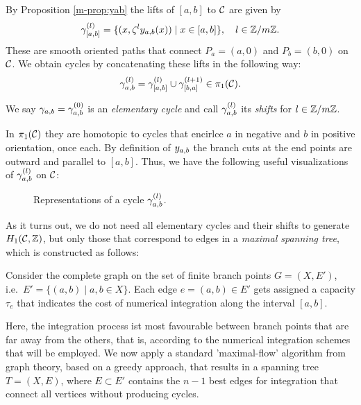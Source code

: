 \documentclass[main.tex]{subfiles}
\begin{document}
   By Proposition \ref{m-prop:yab} the lifts of $[a,b]$ to $\mathcal{C}$ are given by
   \begin{equation}\label{eq:def_path_ab}
      \gamma^{(l)}_{[a,b]} = \{  (x,\zeta^l y_{a,b}(x))  \mid  x \in [a,b]  \}, \quad l \in \mathbb{Z}/m\mathbb{Z}.
   \end{equation}
   These are smooth oriented paths that connect $P_a = (a,0)$ and $P_b = (b,0)$ on $\mathcal{C}$. We obtain cycles by concatenating these lifts in the following way:
    \begin{equation}\label{eq:def_cyabl}
      \gamma_{a,b}^{(l)} = \gamma^{(l)}_{[a,b]} \cup \gamma^{(l+1)}_{[b,a]} \in \pi_1(\mathcal{C}).
   \end{equation}
   \begin{defn}\label{def:elem_cycles}
       We say $\gamma_{a,b} = \gamma_{a,b}^{(0)}$ is an \emph{elementary cycle} and call $\gamma_{a,b}^{(l)}$ its \emph{shifts} for $l \in \mathbb{Z}/m\mathbb{Z}$.
   \end{defn}
   In $\pi_1(\mathcal{C})$
   they are homotopic to cycles that encirlce  $a$ in negative and $b$ in positive orientation, once each.
   By definition of $y_{a,b}$ the branch cuts at the end points are outward and parallel to $[a,b]$. Thus, we have the following useful visualizations of $\gamma_{a,b}^{(l)}$ on $\mathcal{C}$:
   \begin{figure}[H]
      \begin{center}
   
      \end{center}
    \caption{Representations of a cycle $\gamma_{a,b}^{(l)}$.}
    \label{fig:elem_cycle}
\end{figure}

  \bigskip

  As it turns out, we do not need all elementary cycles and their shifts to generate $H_1(\mathcal{C},\mathbb{Z})$, but only those that correspond to edges in a \emph{maximal spanning tree}, which is constructed
  as follows: 
  
  \medskip
   Consider the complete graph on the set of finite branch points $G = (X,E')$, i.e.\ $E' = \{  (a,b)  \mid  a,b \in X \}$.
   Each edge $e = (a,b) \in E'$ gets assigned a capacity $\tau_e$ that indicates the cost of numerical integration along the interval $[a,b]$.
   
    \medskip
   Here, the integration process ist most favourable
   between branch points that are far away from the others, that is, according to the
   numerical integration schemes that will be employed. \abstand
   We now apply a standard 'maximal-flow' algorithm from graph theory, based on a greedy approach, that results in a spanning tree $T = (X,E)$, where $E \subset E'$ contains the $n-1$ best edges
   for integration that connect all vertices without producing cycles.
\end{document}
